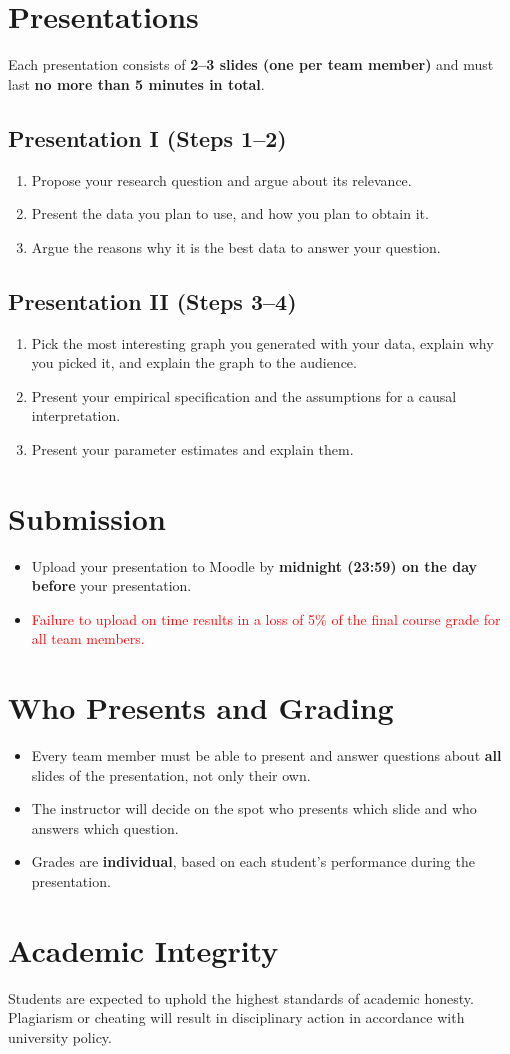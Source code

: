 \documentclass[11pt]{article}
\begin{document}
\section{Presentations}
Each presentation consists of \textbf{2--3 slides (one per team member)} and must last \textbf{no more than 5 minutes in total}.

\subsection{Presentation I (Steps 1--2)}
\begin{enumerate}
    \item Propose your research question and argue about its relevance.
    \item Present the data you plan to use, and how you plan to obtain it.
    \item Argue the reasons why it is the best data to answer your question.
\end{enumerate}

\subsection{Presentation II (Steps 3--4)}
\begin{enumerate}
    \item Pick the most interesting graph you generated with your data, explain why you picked it, and explain the graph to the audience.
    \item Present your empirical specification and the assumptions for a causal interpretation.
    \item Present your parameter estimates and explain them.
\end{enumerate}

\section{Submission}
\begin{itemize}
    \item Upload your presentation to Moodle by \textbf{midnight (23:59) on the day before} your presentation.
    \item \textcolor{red}{Failure to upload on time results in a loss of 5\% of the final course grade for all team members.}
\end{itemize}

\section{Who Presents and Grading}
\begin{itemize}
    \item Every team member must be able to present and answer questions about \textbf{all} slides of the presentation, not only their own.
    \item The instructor will decide on the spot who presents which slide and who answers which question.
    \item Grades are \textbf{individual}, based on each student's performance during the presentation.
\end{itemize}

\section{Academic Integrity}
Students are expected to uphold the highest standards of academic honesty. Plagiarism or cheating will result in disciplinary action in accordance with university policy.
\end{document}
